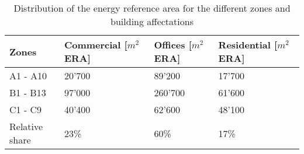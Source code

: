 \begin{table}[h!]
\centering
\caption{Distribution of the energy reference area for the different zones and building affectations}\vspace{2mm}
\label{tab:henchoz_area} 
\begin{tabular}{llll}
\toprule
Zones          & Commercial [$m^{2}$ ERA] & Offices  [$m^{2}$ ERA] & Residential  [$m^{2}$ ERA] \\
\midrule
A1 - A10       & 20'700                   & 89'200                 & 17'700                     \\
B1 - B13       & 97'000                   & 260'700                & 61'600                     \\
C1 - C9        & 40'400                   & 62'600                 & 48'100                     \\
\midrule
Relative share & 23\%                     & 60\%                   & 17\% \\
\bottomrule
\end{tabular}
\end{table}